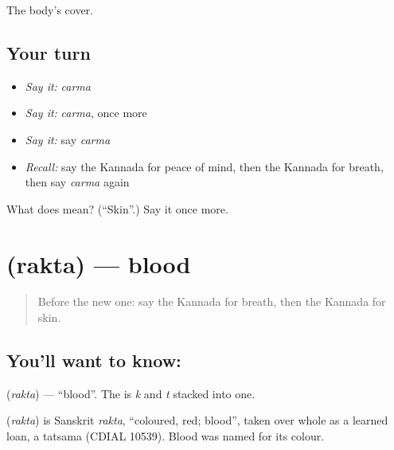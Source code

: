 \begin{grammarlens}[title={What you've built}]
The body's cover.
\end{grammarlens}

\subsection*{Your turn}
\begin{itemize}
\raggedright
  \item \emph{Say it:} \emph{carma}
  \item \emph{Say it:} \emph{carma}, once more
  \item \emph{Say it:} say \emph{carma}
  \item \emph{Recall:} say the Kannada for peace of mind, then the Kannada for breath, then say \emph{carma} again
\end{itemize}

\begin{tcolorbox}[breakable,colback=teal!4,colframe=teal!35!black,title={Before you move on}]
What does  mean? (\textquotedblleft{}Skin\textquotedblright{}.) Say it once more.
\end{tcolorbox}
\section[\texorpdfstring{\kn{ರಕ್ತ} (rakta)}{ರಕ್ತ (rakta)}]{ (rakta) — blood}

\label{lesson:KA-C99-blood}



\begin{quote}
Before the new one: say the Kannada for breath, then the Kannada for skin.
\end{quote}

\subsection*{You'll want to know: }
\textbf{} (\emph{rakta}) — \textquotedblleft{}blood\textquotedblright{}. The \textbf{} is \emph{k} and \emph{t} stacked into one.

\begin{cousinweb}
\textbf{} (\emph{rakta}) is Sanskrit \emph{rakta}, \textquotedblleft{}coloured, red; blood\textquotedblright{}, taken over whole as a learned loan, a tatsama (CDIAL 10539). Blood was named for its colour.
\end{cousinweb}


